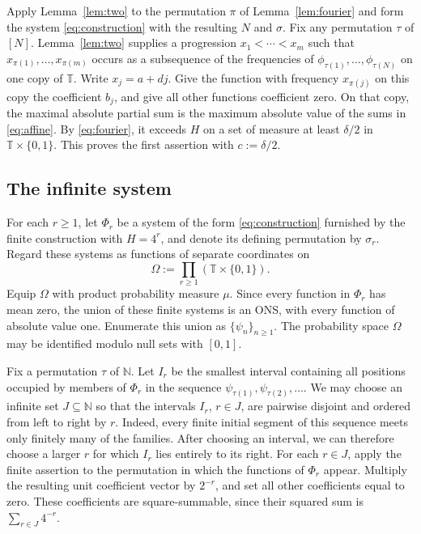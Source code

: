 \documentclass[11pt]{article}
\theoremstyle{remark}
\numberwithin{equation}{section}
\newcommand{\T}{\mathbb T}
\newcommand{\N}{\mathbb N}
\begin{document}
Apply Lemma~\ref{lem:two} to the permutation $\pi$ of Lemma~\ref{lem:fourier} and form the system \eqref{eq:construction} with the resulting $N$ and $\sigma$. Fix any permutation $\tau$ of $[N]$. Lemma~\ref{lem:two} supplies a progression $x_1<\cdots<x_m$ such that $x_{\pi(1)},\ldots,x_{\pi(m)}$ occurs as a subsequence of the frequencies of $\phi_{\tau(1)},\ldots,\phi_{\tau(N)}$ on one copy of $\T$. Write $x_j=a+dj$. Give the function with frequency $x_{\pi(j)}$ on this copy the coefficient $b_j$, and give all other functions coefficient zero. On that copy, the maximal absolute partial sum is the maximum absolute value of the sums in \eqref{eq:affine}. By \eqref{eq:fourier}, it exceeds $H$ on a set of measure at least $\delta/2$ in $\T\times\{0,1\}$. This proves the first assertion with $c:=\delta/2$.

\subsection*{The infinite system}

For each $r\geq1$, let $\Phi_r$ be a system of the form \eqref{eq:construction} furnished by the finite construction with $H=4^r$, and denote its defining permutation by $\sigma_r$. Regard these systems as functions of separate coordinates on
\[
 \Omega:=\prod_{r\geq1}(\T\times\{0,1\}).
\]
Equip $\Omega$ with product probability measure $\mu$. Since every function in $\Phi_r$ has mean zero, the union of these finite systems is an ONS, with every function of absolute value one. Enumerate this union as $\{\psi_n\}_{n\geq1}$. The probability space $\Omega$ may be identified modulo null sets with $[0,1]$.

Fix a permutation $\tau$ of $\N$. Let $I_r$ be the smallest interval containing all positions occupied by members of $\Phi_r$ in the sequence $\psi_{\tau(1)},\psi_{\tau(2)},\ldots$. We may choose an infinite set $J\subseteq\N$ so that the intervals $I_r$, $r\in J$, are pairwise disjoint and ordered from left to right by $r$. Indeed, every finite initial segment of this sequence meets only finitely many of the families. After choosing an interval, we can therefore choose a larger $r$ for which $I_r$ lies entirely to its right. For each $r\in J$, apply the finite assertion to the permutation in which the functions of $\Phi_r$ appear. Multiply the resulting unit coefficient vector by $2^{-r}$, and set all other coefficients equal to zero. These coefficients are square-summable, since their squared sum is $\sum_{r\in J}4^{-r}$.
\end{document}
